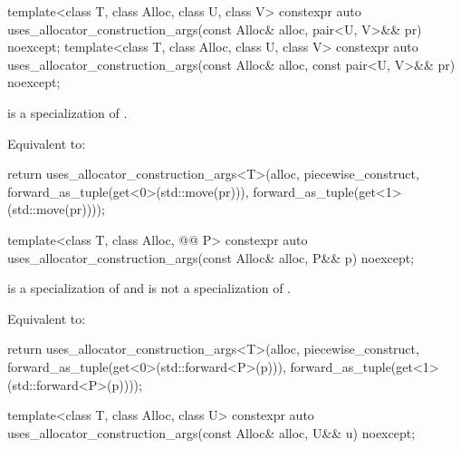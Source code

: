 %
\begin{itemdecl}
template<class T, class Alloc, class U, class V>
  constexpr auto uses_allocator_construction_args(const Alloc& alloc,
                                                  pair<U, V>&& pr) noexcept;
template<class T, class Alloc, class U, class V>
  constexpr auto uses_allocator_construction_args(const Alloc& alloc,
                                                  const pair<U, V>&& pr) noexcept;
\end{itemdecl}

\begin{itemdescr}
\pnum
\constraints
{} is a specialization of .

\pnum
\effects
Equivalent to:
\begin{codeblock}
return uses_allocator_construction_args<T>(alloc, piecewise_construct,
                                           forward_as_tuple(get<0>(std::move(pr))),
                                           forward_as_tuple(get<1>(std::move(pr))));
\end{codeblock}
\end{itemdescr}

%
\begin{itemdecl}
template<class T, class Alloc, @@ P>
  constexpr auto uses_allocator_construction_args(const Alloc& alloc, P&& p) noexcept;
\end{itemdecl}

\begin{itemdescr}
\pnum
\constraints
{} is a specialization of  and
 is not a specialization of .

\pnum
\effects
Equivalent to:
\begin{codeblock}
return uses_allocator_construction_args<T>(alloc, piecewise_construct,
                                           forward_as_tuple(get<0>(std::forward<P>(p))),
                                           forward_as_tuple(get<1>(std::forward<P>(p))));
\end{codeblock}
\end{itemdescr}

%
\begin{itemdecl}
template<class T, class Alloc, class U>
  constexpr auto uses_allocator_construction_args(const Alloc& alloc, U&& u) noexcept;
\end{itemdecl}

